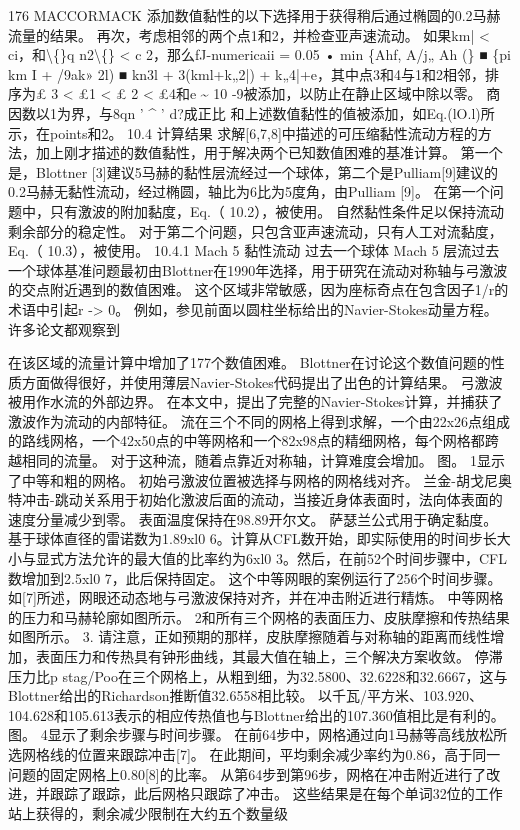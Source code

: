\documentclass[UTF8,11pt,a4paper,openany,fontset=fandol]{ctexbook}
\begin{document}
176 MACCORMACK 添加数值黏性的以下选择用于获得稍后通过椭圆的0.2马赫流量的结果。 再次，考虑相邻的两个点1和2，并检查亚声速流动。 如果km| < ci，和\textbackslash\{\}q n2\textbackslash\{\} < c 2，那么fJ-numericaii = 0.05 • min \{Ahf, A/j„ Ah (\} ■ \{pi km I + /9ak» 2l) ■ kn3l + 3(kml+k„2|) + k„4|+e，其中点3和4与1和2相邻，排序为£ 3 < £1 < £ 2 < £4和e \textasciitilde{} 10 -9被添加，以防止在静止区域中除以零。 商因数以1为界，与8qn ' \textasciicircum{} ' d?成正比 和上述数值黏性的值被添加，如Eq.(lO.l)所示，在points和2。 10.4 计算结果 求解[6,7,8]中描述的可压缩黏性流动方程的方法，加上刚才描述的数值黏性，用于解决两个已知数值困难的基准计算。 第一个是，Blottner [3]建议5马赫的黏性层流经过一个球体，第二个是Pulliam[9]建议的0.2马赫无黏性流动，经过椭圆，轴比为6比为5度角，由Pulliam [9]。 在第一个问题中，只有激波的附加黏度，Eq.（ 10.2），被使用。 自然黏性条件足以保持流动剩余部分的稳定性。 对于第二个问题，只包含亚声速流动，只有人工对流黏度，Eq.（ 10.3），被使用。 10.4.1 Mach 5 黏性流动 过去一个球体 Mach 5 层流过去一个球体基准问题最初由Blottner在1990年选择，用于研究在流动对称轴与弓激波的交点附近遇到的数值困难。 这个区域非常敏感，因为座标奇点在包含因子1/r的术语中引起r -> 0。 例如，参见前面以圆柱坐标给出的Navier-Stokes动量方程。 许多论文都观察到

在该区域的流量计算中增加了177个数值困难。 Blottner在讨论这个数值问题的性质方面做得很好，并使用薄层Navier-Stokes代码提出了出色的计算结果。 弓激波被用作水流的外部边界。 在本文中，提出了完整的Navier-Stokes计算，并捕获了激波作为流动的内部特征。 流在三个不同的网格上得到求解，一个由22x26点组成的路线网格，一个42x50点的中等网格和一个82x98点的精细网格，每个网格都跨越相同的流量。 对于这种流，随着点靠近对称轴，计算难度会增加。 图。 1显示了中等和粗的网格。 初始弓激波位置被选择与网格的网格线对齐。 兰金-胡戈尼奥特冲击-跳动关系用于初始化激波后面的流动，当接近身体表面时，法向体表面的速度分量减少到零。 表面温度保持在98.89开尔文。 萨瑟兰公式用于确定黏度。 基于球体直径的雷诺数为1.89xl0 6。计算从CFL数开始，即实际使用的时间步长大小与显式方法允许的最大值的比率约为6xl0 3。然后，在前52个时间步骤中，CFL数增加到2.5xl0 7，此后保持固定。 这个中等网眼的案例运行了256个时间步骤。 如[7]所述，网眼还动态地与弓激波保持对齐，并在冲击附近进行精炼。 中等网格的压力和马赫轮廓如图所示。 2和所有三个网格的表面压力、皮肤摩擦和传热结果如图所示。 3. 请注意，正如预期的那样，皮肤摩擦随着与对称轴的距离而线性增加，表面压力和传热具有钟形曲线，其最大值在轴上，三个解决方案收敛。 停滞压力比p stag/Poo在三个网格上，从粗到细，为32.5800、32.6228和32.6667，这与Blottner给出的Richardson推断值32.6558相比较。 以千瓦/平方米、103.920、104.628和105.613表示的相应传热值也与Blottner给出的107.360值相比是有利的。 图。 4显示了剩余步骤与时间步骤。 在前64步中，网格通过向1马赫等高线放松所选网格线的位置来跟踪冲击[7]。 在此期间，平均剩余减少率约为0.86，高于同一问题的固定网格上0.80[8]的比率。 从第64步到第96步，网格在冲击附近进行了改进，并跟踪了跟踪，此后网格只跟踪了冲击。 这些结果是在每个单词32位的工作站上获得的，剩余减少限制在大约五个数量级
\end{document}
